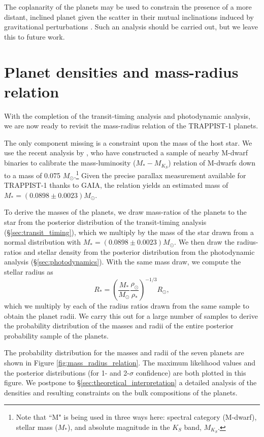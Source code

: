 \documentclass[twocolumn]{aastex63}
\begin{document}
The coplanarity of the planets may be used to constrain the presence of a
more distant, inclined planet given the scatter in their mutual inclinations
induced by gravitational perturbations \citep{JontofHutter2018}.  Such an
analysis should be carried out, but we leave this to future work.

\section{Planet densities and mass-radius relation} \label{sec:mass_radius_relation}

With the completion of the transit-timing analysis and photodynamic analysis, we are now ready to revisit the mass-radius relation of the TRAPPIST-1 planets.  

The only component missing is a constraint upon the mass of the host star.  We use the recent analysis by \citet{Mann2019}, who have constructed a sample of nearby M-dwarf binaries to calibrate the mass-luminosity ($M_*-M_{K_S}$) relation of M-dwarfs down to a mass of 0.075 $M_\odot$.\footnote{Note that ``M" is being used in three ways here: spectral category (M-dwarf), stellar mass ($M_*$), and
absolute magnitude in the $K_S$ band, $M_{K_S}$.}   Given the precise parallax measurement available for TRAPPIST-1 thanks to GAIA, the relation yields an estimated mass of $M_* = (0.0898\pm 0.0023) M_\odot$.

To derive the masses of the planets, we draw mass-ratios of the planets to the star from the posterior distribution of the transit-timing analysis (\S \ref{sec:transit_timing}), which we multiply by the mass of the star drawn from a normal distribution with $M_* = (0.0898\pm 0.0023) M_\odot$. We then draw the radius-ratios and stellar density from the posterior distribution from the photodynamic analysis (\S \ref{sec:photodynamics}).
With the same mass draw, we compute the stellar radius as
\begin{equation}
    R_* = \left(\frac{M_*}{M_\odot}\frac{\rho_\odot}{\rho_*}\right)^{-1/3} R_\odot,
\end{equation} 
which we multiply by each of the radius ratios drawn from the same sample to obtain the planet radii.   We carry this out for a large number of samples to derive the probability distribution of the masses and radii of the entire posterior probability sample of the planets.

The probability distribution for the masses and radii of the seven planets are shown in Figure \ref{fig:mass_radius_relation}.  The maximum likelihood values and the posterior distributions (for 1- and 2-$\sigma$ confidence) are both plotted in this figure.  We postpone to \S\ref{sec:theoretical_interpretation} a detailed analysis of the densities and resulting constraints on the bulk compositions of the planets.
\end{document}
